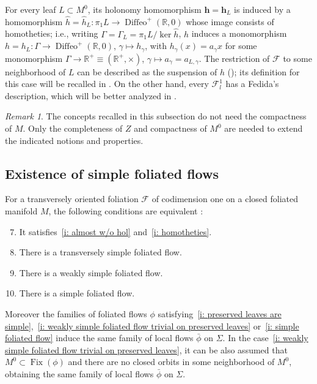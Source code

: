 \documentclass{memo-l}
\theoremstyle{plain}
\theoremstyle{definition}
\theoremstyle{remark}
\newtheorem{rem}[thm]{Remark}
\newcommand{\R}{\mathbb{R}}
\newcommand{\FF}{\mathcal{F}}
\newcommand{\bfh}{\boldsymbol{h}}
\newcommand{\Diffeo}{\operatorname{Diffeo}}
\newcommand{\Fix}{\operatorname{Fix}}
\numberwithin{section}{chapter}
\numberwithin{equation}{section}%
\begin{document}
For every leaf $L\subset M^0$, its holonomy homomorphism $\bfh=\bfh_L$ is induced by a homomorphism $\hat h=\hat h_L:\pi_1L\to\Diffeo^+(\R,0)$ whose image consists of homotheties; i.e., writing $\Gamma=\Gamma_L=\pi_1 L/\ker\hat h$, $\hat h$ induces a monomorphism $h=h_L:\Gamma\to\Diffeo^+(\R,0)$, $\gamma\mapsto h_\gamma$, with $h_\gamma(x)=a_\gamma x$ for some monomorphism $\Gamma\to\R^+\equiv(\R^+,\times)$, $\gamma\mapsto a_\gamma=a_{L,\gamma}$. The restriction of $\FF$ to some neighborhood of $L$ can be described as the suspension of $h$ (); its definition for this case will be recalled in . On the other hand, every $\FF^1_l$ has a Fedida's description, which will be better analyzed in .

\begin{rem}\label{r: case where M is not compact}
The concepts recalled in this subsection do not need the compactness of $M$. Only the completeness of $Z$ and compactness of $M^0$ are needed to extend the indicated notions and properties.
\end{rem}



\subsection{Existence of simple foliated flows}\label{ss: existence}

For a transversely oriented foliation $\FF$ of codimension one on a closed foliated manifold $M$, the following conditions are equivalent \cite[Propositions~6.1 and~6.3 and Theorem~6.9]{AlvKordyLeichtnam2022}:
\begin{enumerate}[{\rm(a)}]
\setcounter{enumi}{6}
\item\label{i: A-B} It satisfies~\ref{i: almost w/o hol} and~\ref{i: homotheties}.
\item\label{i: preserved leaves are simple} There is a transversely simple foliated flow.
\item\label{i: weakly simple foliated flow trivial on preserved leaves} There is a weakly simple foliated flow.
\item\label{i: simple foliated flow} There is a simple foliated flow.
\end{enumerate}
Moreover the families of foliated flows $\phi$ satisfying~\ref{i: preserved leaves are simple},~\ref{i: weakly simple foliated flow trivial on preserved leaves} or~\ref{i: simple foliated flow} induce the same family of local flows $\bar\phi$ on $\Sigma$. In the case~\ref{i: weakly simple foliated flow trivial on preserved leaves}, it can be also assumed that $M^0\subset\Fix(\phi)$ and there are no closed orbits in some neighborhood of $M^0$, obtaining the same family of local flows $\bar\phi$ on $\Sigma$.
\end{document}
